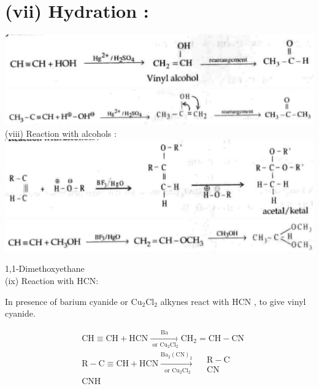 \documentclass[10pt]{article}
\begin{document}
\section*{(vii) Hydration :}
\includegraphics[max width=\textwidth, center]{2025_01_28_8470952b98110cec3aabg-191(7)}\\
\includegraphics[max width=\textwidth, center]{2025_01_28_8470952b98110cec3aabg-191(2)}\\
(viii) Reaction with alcohols :\\
\includegraphics[max width=\textwidth, center]{2025_01_28_8470952b98110cec3aabg-191(5)}\\
\includegraphics[max width=\textwidth, center]{2025_01_28_8470952b98110cec3aabg-191(1)}

1,1-Dimethoxyethane\\
(ix) Reaction with HCN:

In presence of barium cyanide or $\mathrm{Cu}_{2} \mathrm{Cl}_{2}$ alkynes react with HCN , to give vinyl cyanide.

$$
\begin{aligned}
& \mathrm{CH} \equiv \mathrm{CH}+\mathrm{HCN} \xrightarrow[\text { or } \mathrm{Cu}_{2} \mathrm{Cl}_{2}]{\mathrm{Ba}} \mathrm{CH}_{2}=\mathrm{CH}-\mathrm{CN} \\
& \mathrm{R}-\mathrm{C} \equiv \mathrm{CH}+\mathrm{HCN} \xrightarrow[\text { or } \mathrm{Cu}_{2} \mathrm{Cl}_{2}]{\mathrm{Ba}_{2}(\mathrm{CN})_{2}} \quad \begin{array}{c}
\mathrm{R}-\mathrm{C} \\
\mathrm{CN}
\end{array} \\
& \mathrm{CNH}
\end{aligned}
$$
\end{document}
